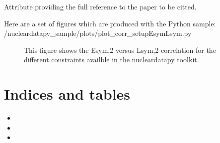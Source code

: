 \documentclass[letterpaper,10pt,english]{sphinxmanual}
\begin{document}
\begin{fulllineitems}
\begin{fulllineitems}
\end{fulllineitems}


\begin{fulllineitems}
\label{\detokenize{source/api/setup_corr_EsymLsym:nucleardatapy.corr.setup_EsymLsym.setupEsymLsym.ref}}
\pysigstartsignatures
{}
\pysigstopsignatures
\sphinxAtStartPar
Attribute providing the full reference to the paper to be citted.

\end{fulllineitems}


\end{fulllineitems}


\sphinxAtStartPar
Here are a set of figures which are produced with the Python sample: /nucleardatapy\_sample/plots/plot\_corr\_setupEsymLsym.py

\begin{figure}[htbp]
\centering
\capstart

\noindent{}
\caption{This figure shows the Esym,2 versus Lsym,2 correlation for the different constraints availble in the nucleardatapy toolkit.}\label{\detokenize{source/api/setup_corr_EsymLsym:id1}}\end{figure}


\chapter{Indices and tables}
\label{\detokenize{index:indices-and-tables}}\begin{itemize}
\item {} 
\sphinxAtStartPar
{}

\item {} 
\sphinxAtStartPar
{}

\item {} 
\sphinxAtStartPar
{}

\end{itemize}
\end{document}
